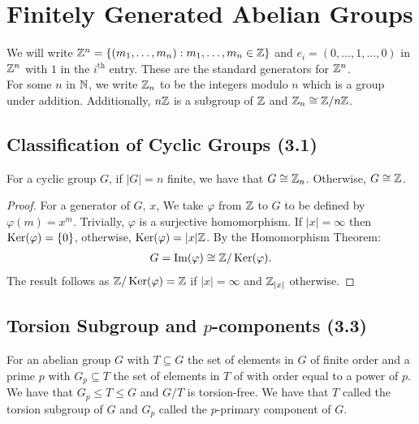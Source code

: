 \section{Finitely Generated Abelian Groups}

We will write $\mathbb{Z}^n = \{(m_1, \ldots, m_n) : m_1, \ldots, m_n \in \mathbb{Z}\}$
and $e_i = (0, \ldots, 1, \ldots, 0)$ in $\mathbb{Z}^n$ with $1$ in the 
$i^{\text{th}}$ entry. These are the standard generators for $\mathbb{Z}^n$.
\\[\baselineskip]
For some $n$ in $\mathbb{N}$, we write $\mathbb{Z}_n$ to be the integers
modulo $n$ which is a group under addition. Additionally, $n\mathbb{Z}$
is a subgroup of $\mathbb{Z}$ and $\mathbb{Z}_n \cong \mathbb{Z}/n\mathbb{Z}$.

\subsection{Classification of Cyclic Groups (3.1)} \label{3.1}

For a cyclic group $G$, if $|G| = n$ finite, we have that $G \cong \mathbb{Z}_n$.
Otherwise, $G \cong \mathbb{Z}$.

\begin{proof}
    For a generator of $G$, $x$, We take $\varphi$ from $\mathbb{Z}$ to $G$
    to be defined by $\varphi(m) = x^m$. Trivially, $\varphi$ is a
    surjective homomorphism. If $|x| = \infty$ then $\operatorname{Ker}(\varphi) = \{0\}$,
    otherwise, $\operatorname{Ker}(\varphi) = |x|\mathbb{Z}$. By the Homomorphism Theorem:
    \begin{align*}
        G = \operatorname{Im}(\varphi) \cong \mathbb{Z}/\operatorname{Ker}(\varphi).
    \end{align*} The result follows as $\mathbb{Z}/\operatorname{Ker}(\varphi) = \mathbb{Z}$
    if $|x| = \infty$ and $\mathbb{Z}_{|x|}$ otherwise.
\end{proof}

\subsection{Torsion Subgroup and $p$-components (3.3)} \label{3.3}

For an abelian group $G$ with $T \subseteq G$ the set of
elements in $G$ of finite order and a prime $p$ with
$G_p \subseteq T$ the set of elements in $T$ of with order
equal to a power of $p$. We have that $G_p \leq T \leq G$
and $G/T$ is torsion-free.
We have that $T$ called the torsion subgroup of $G$ and $G_p$ called
the $p$-primary component of $G$.

